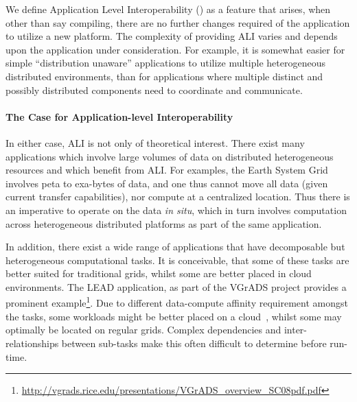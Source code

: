 \documentclass[3p,twocolumn]{elsarticle}
\begin{document}

We define Application Level Interoperability () as a feature
that arises, when other than say compiling, there are no further
changes required of the application to utilize a new platform.
The complexity of providing ALI varies and depends upon the
application under consideration.  For example, it is somewhat easier
for simple ``distribution unaware'' applications to utilize multiple
heterogeneous distributed environments, than for applications where
multiple distinct and possibly distributed components need to
coordinate and communicate.


\paragraph{The Case for Application-level Interoperability}

In either case, ALI is not only of theoretical interest. There exist
many applications which involve large volumes of data on distributed
heterogeneous resources and which benefit from ALI. For examples, the
Earth System Grid~\cite{esg} involves peta to exa-bytes of data, and
one thus cannot move all data (given current transfer capabilities),
nor compute at a centralized location.  Thus there is an imperative to
operate on the data {\it in situ}, which in turn involves computation
across heterogeneous distributed platforms as part of the same
application.

In addition, there exist a wide range of applications that have
decomposable but heterogeneous computational tasks. It is conceivable,
that some of these tasks are better suited for traditional grids,
whilst some are better placed in cloud environments.  The LEAD
application, as part of the VGrADS project provides a prominent
example\footnote{\url{http://vgrads.rice.edu/presentations/VGrADS_overview_SC08pdf.pdf}}.
Due to different data-compute affinity requirement amongst the tasks,
some workloads might be better placed on a cloud~\cite{jha_ccpe09},
whilst some may optimally be located on regular grids. Complex
dependencies and inter-relationships between sub-tasks make this often
difficult to determine before run-time.
\end{document}
